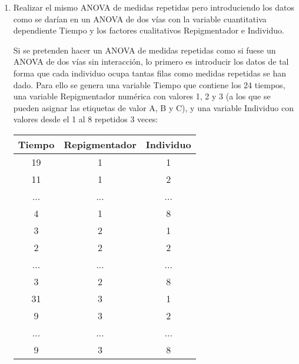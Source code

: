 \begin{enumerate}
\begin{enumerate}
\begin{indicacion}
{}
\end{indicacion}


\item Realizar el mismo ANOVA de medidas repetidas pero introduciendo los datos como se darían en un ANOVA de dos vías con la variable cuantitativa dependiente Tiempo y los factores cualitativos Repigmentador e Individuo.

\begin{indicacion}{Si se pretenden hacer un ANOVA de medidas repetidas como si fuese un ANOVA de dos vías sin interacción, lo primero es introducir los datos de tal forma que cada individuo ocupa tantas filas como medidas repetidas se han dado. Para ello se genera una variable Tiempo que contiene los 24 tiempos, una variable Repigmentador numérica con valores 1, 2 y 3 (a los que se pueden asignar las etiquetas de valor A, B y C), y una variable Individuo con valores desde el 1 al 8 repetidos 3 veces:

\begin{center}

\begin{tabular}{|l|l|l|}
\hline
\multicolumn{1}{|c|}{Tiempo} & \multicolumn{1}{c|}{Repigmentador} & \multicolumn{1}{c|}{Individuo} \\
\hline
\multicolumn{1}{|c|}{19} & \multicolumn{1}{c|}{1} & \multicolumn{1}{c|}{1} \\
\hline
\multicolumn{1}{|c|}{11} & \multicolumn{1}{c|}{1} & \multicolumn{1}{c|}{2} \\
\hline
\multicolumn{1}{|c|}{...} & \multicolumn{1}{c|}{...} & \multicolumn{1}{c|}{...} \\
\hline
\multicolumn{1}{|c|}{4} & \multicolumn{1}{c|}{1} & \multicolumn{1}{c|}{8} \\
\hline
\multicolumn{1}{|c|}{3} & \multicolumn{1}{c|}{2} & \multicolumn{1}{c|}{1} \\
\hline
\multicolumn{1}{|c|}{2} & \multicolumn{1}{c|}{2} & \multicolumn{1}{c|}{2} \\
\hline
\multicolumn{1}{|c|}{...} & \multicolumn{1}{c|}{...} & \multicolumn{1}{c|}{...} \\
\hline
\multicolumn{1}{|c|}{3} & \multicolumn{1}{c|}{2} & \multicolumn{1}{c|}{8} \\
\hline
\multicolumn{1}{|c|}{31} & \multicolumn{1}{c|}{3} & \multicolumn{1}{c|}{1} \\
\hline
\multicolumn{1}{|c|}{9} & \multicolumn{1}{c|}{3} & \multicolumn{1}{c|}{2} \\
\hline
\multicolumn{1}{|c|}{...} & \multicolumn{1}{c|}{...} & \multicolumn{1}{c|}{...} \\
\hline
\multicolumn{1}{|c|}{9} & \multicolumn{1}{c|}{3} & \multicolumn{1}{c|}{8} \\
\hline
\end{tabular}


\end{center}}
\end{indicacion}
\end{enumerate}
\end{enumerate}
